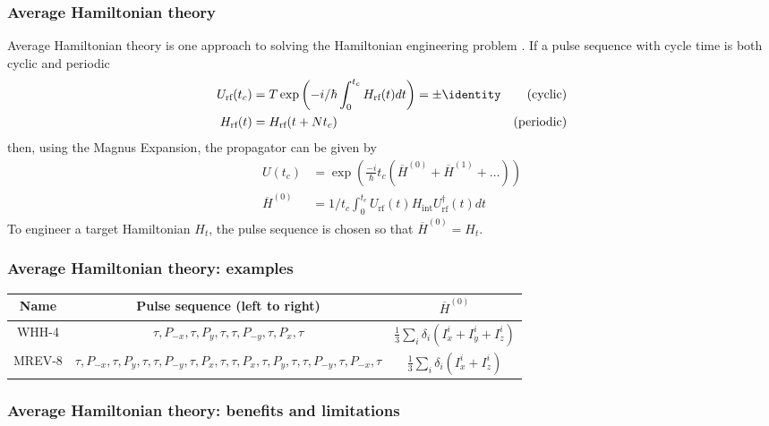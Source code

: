 \documentclass{beamer}
\begin{document}
\begin{frame}
\frametitle{Average Hamiltonian theory}

Average Hamiltonian theory is one approach to solving the Hamiltonian engineering problem
\cite{PhysRev.175.453}.
If a pulse sequence with cycle time is both cyclic and periodic
\cite{gerstein-dybowski}
\begin{align}\label{eq:AHT_conditions}
    U_\text{rf}(t_c) &= T\exp \left(
        -i/\hbar \int_0^{t_c} H_\text{rf}(t) dt \right) = \pm \identity
        & \text{(cyclic)} \\
    H_\text{rf}(t) &= H_\text{rf}(t + Nt_c) & \text{(periodic)}
\end{align}
then, using the Magnus Expansion, the propagator can be given by
\begin{align}\label{eq:AHT_average}
    U(t_c) &= \exp\left( \frac{-i}{\hbar} t_c (\overline{H}^{(0)} +
        \overline{H}^{(1)} + \dots) \right) \\
    \overline{H}^{(0)} &= 1/t_c \int_0^{t_c}
        U_\text{rf}(t) H_\text{int} U_\text{rf}^\dagger(t) dt
\end{align}
To engineer a target Hamiltonian $H_t$, the pulse sequence is chosen so that $\overline{H}^{(0)} = H_t$.

\end{frame}

\begin{frame}
\frametitle{Average Hamiltonian theory: examples}

\begin{tabular}{c c c}
    Name & Pulse sequence (left to right) & $\overline{H}^{(0)}$ \\
    \hline
    WHH-4 \cite{PhysRevLett.20.180} &
        $\tau, P_{-x}, \tau, P_y, \tau, \tau, P_{-y}, \tau, P_x, \tau$ &
        $\frac{1}{3} \sum_i \delta_i \left( I_x^i + I_y^i + I_z^i \right)$ \\
    MREV-8 \cite{mansfield1971symmetrized} &
        $\tau, P_{-x}, \tau, P_y, \tau, \tau, P_{-y}, \tau, P_x, \tau, \tau, P_{x}, \tau, P_y, \tau, \tau, P_{-y}, \tau, P_{-x}, \tau$ &
        $\frac{1}{3} \sum_i \delta_i \left( I_x^i + I_z^i \right)$ \\
\end{tabular}

\end{frame}

\begin{frame}
\frametitle{Average Hamiltonian theory: benefits and limitations}



\end{frame}
\end{document}
